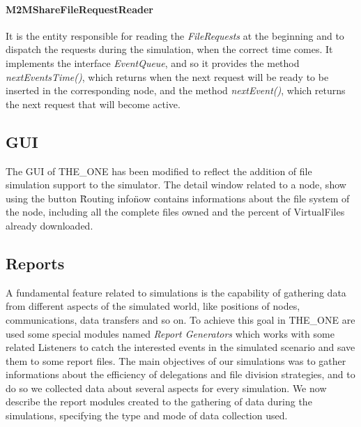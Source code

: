\paragraph{M2MShareFileRequestReader}
It is the entity responsible for reading the \textit{FileRequests} at the beginning and to dispatch the requests during the simulation, when the correct time comes. It implements the interface \textit{EventQueue}, and so it provides the method \textit{nextEventsTime()}, which returns when the next request will be ready to be inserted in the corresponding node, and the method \textit{nextEvent()}, which returns the next request that will become active.


\subsection{GUI}
The GUI of THE\_ONE has been modified to reflect the addition of file simulation support to the simulator. The detail window related to a node, show using the button \"Routing info\" now contains informations about the file system of the node, including all the complete files owned and the percent of VirtualFiles already downloaded. 

\subsection{Reports}
A fundamental feature related to simulations is the capability of gathering data from different aspects of the simulated world, like positions of nodes, communications, data transfers and so on. To achieve this goal in THE\_ONE are used some special modules named \textit{Report Generators} which works with some related Listeners to catch the interested events in the simulated scenario and save them to some report files.
The main objectives of our simulations was to gather informations about the efficiency of delegations and file division strategies, and to do so we collected data about several aspects for every simulation. We now describe the report modules created to the gathering of data during the simulations, specifying the type and mode of data collection used.

